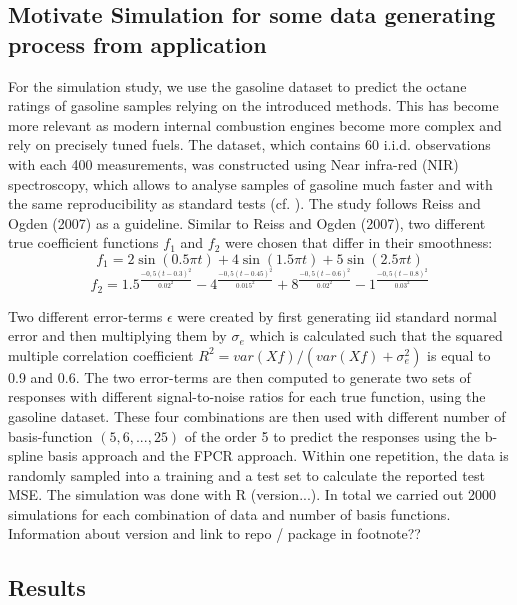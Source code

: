 \documentclass[11pt,twoside,a4paper]{article}
\begin{document}
	\subsection{Motivate Simulation for some data generating process from application}
	For the simulation study, we use the gasoline dataset to predict the octane ratings of gasoline samples relying on the introduced methods. This has become more relevant as modern internal combustion engines become more complex and rely on precisely tuned fuels. The dataset, which contains 60 i.i.d. observations with each 400 measurements, was constructed using Near infra-red (NIR) spectroscopy, which allows to analyse samples of gasoline much faster and with the same reproducibility as standard tests (cf. \cite{Bohacs_Ovadi_Salgo1998}). The study follows Reiss and Ogden (2007) as a guideline. Similar to Reiss and Ogden (2007), two different true coefficient functions $f_1$ and $f_2$ were chosen that differ in their smoothness: 
\begin{equation}
    f_1 = 2\sin(0.5\pi t) + 4\sin(1.5 \pi t) + 5\sin(2.5 \pi t) 
    \end{equation}
    \begin{equation}
    f_2 = 1.5^{\frac{-0,5(t-0.3)^2}{0.02^2}} - 4^{\frac{-0,5(t-0.45)^2}{0.015^2}} +  8^{\frac{-0,5(t-0.6)^2}{0.02^2}} -  1^{\frac{-0,5(t-0.8)^2}{0.03^2}}
    \end{equation}

Two different error-terms $\epsilon $ were created by first generating iid standard normal error and then multiplying them by $\sigma_e $ which is calculated such that the squared multiple correlation coefficient $R^2 = var(Xf) / (var(Xf) + \sigma^2_{e})$ is equal to 0.9 and 0.6. The two error-terms are then computed to generate two sets of responses with different signal-to-noise ratios for each true function, using the gasoline dataset. These four combinations are then used with different number of basis-function $(5,6,...,25)$ of the order 5 to predict the responses using the b-spline basis approach and the FPCR approach. Within one repetition, the data is randomly sampled into a training and a test set to calculate the reported test MSE. The simulation was done with R (version...). In total we carried out 2000 simulations for each combination of data and number of basis functions. {\color{green} Information about version and link to repo / package in footnote??}

\subsection{Results}
\end{document}
